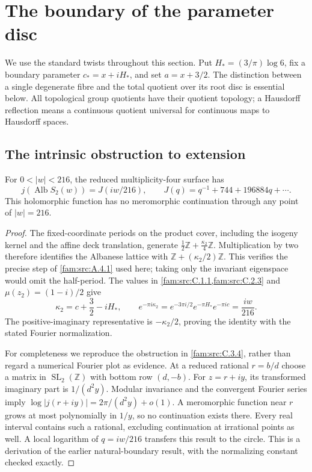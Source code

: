 \section{The boundary of the parameter disc}\label{push:section:D}

We use the standard twists throughout this section. Put
\(H_*=(3/\pi)\log6\), fix a boundary parameter
\(c_*=x+iH_*\), and set \(a=x+3/2\). The distinction between a
single degenerate fibre and the total quotient over its root disc is
essential below. All topological group quotients have their quotient
topology; a Hausdorff reflection means a continuous quotient universal
for continuous maps to Hausdorff spaces.

\subsection{The intrinsic obstruction to extension}\label{push:section:D.1}

\begin{proposition}\label{push:src:D.1.1}
For \(0<|w|<216\), the reduced multiplicity-four surface has
\[
 j(\operatorname{Alb}S_2(w))=J(iw/216),\qquad
 J(q)=q^{-1}+744+196884q+\cdots.
\]
This holomorphic function has no meromorphic continuation through any
point of \(|w|=216\).
\end{proposition}

\begin{proof}
The fixed-coordinate periods on the product cover, including the
isogeny kernel and the affine deck translation, generate
\(\frac12\mathbb Z+\frac{\kappa_2}{4}\mathbb Z\).
Multiplication by two therefore identifies the Albanese lattice with
\(\mathbb Z+(\kappa_2/2)\mathbb Z\). This verifies the precise step of
\cref{fam:src:A.4.1} used here; taking only the invariant eigenspace would omit the
half-period. The values in \cref{fam:src:C.1.1,fam:src:C.2.3} and \(\mu(z_2)=(1-i)/2\) give
\[
 \kappa_2=c+\frac32-iH_*,\qquad
 e^{-\pi i\kappa_2}=e^{-3\pi i/2}e^{-\pi H_*}e^{-\pi ic}
 =\frac{iw}{216}.
\]
The positive-imaginary representative is \(-\kappa_2/2\), proving the
identity with the stated Fourier normalization.

For completeness we reproduce the obstruction in \cref{fam:src:C.3.4}, rather than regard a numerical Fourier plot as evidence. At a
reduced rational \(r=b/d\) choose a matrix in
\(\operatorname{SL}_2(\mathbb Z)\) with bottom row \((d,-b)\).
For \(z=r+iy\), its transformed imaginary part is \(1/(d^2y)\).
Modular invariance and the convergent Fourier series imply
\(\log|j(r+iy)|=2\pi/(d^2y)+o(1)\).
A meromorphic function near \(r\) grows at most polynomially in
\(1/y\), so no continuation exists there. Every real interval contains
such a rational, excluding continuation at irrational points as well.
A local logarithm of \(q=iw/216\) transfers this result to the circle.
This is a derivation of the earlier natural-boundary result, with the
normalizing constant checked exactly.
\end{proof}

